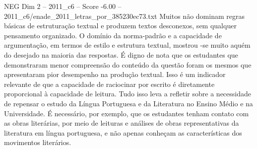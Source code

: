 \begin{textsample}{NEG Dim 2 – 2011\_c6 – Score -6.00 – 2011\_c6/enade\_2011\_letras\_por\_385230ec73.txt}
Muitos não dominam regras básicas de estruturação textual e produzem textos desconexos, sem qualquer pensamento organizado.
O domínio da norma-padrão e a capacidade de argumentação, em termos de estilo e estrutura textual, mostrou -se muito aquém do desejado na maioria das respostas.
É digno de nota que os estudantes que demonstraram menor compreensão do conteúdo da questão foram os mesmos que apresentaram pior desempenho na produção textual.
Isso é um indicador relevante de que a capacidade de raciocinar por escrito é diretamente proporcional à capacidade de leitura.
Tudo isso leva a refletir sobre a necessidade de repensar o estudo da Língua Portuguesa e da Literatura no Ensino Médio e na Universidade.
É necessário, por exemplo, que os estudantes tenham contato com as obras literárias, por meio de leituras e análises de obras representativas da literatura em língua portuguesa, e não apenas conheçam as características dos movimentos literários.

\end{textsample}
